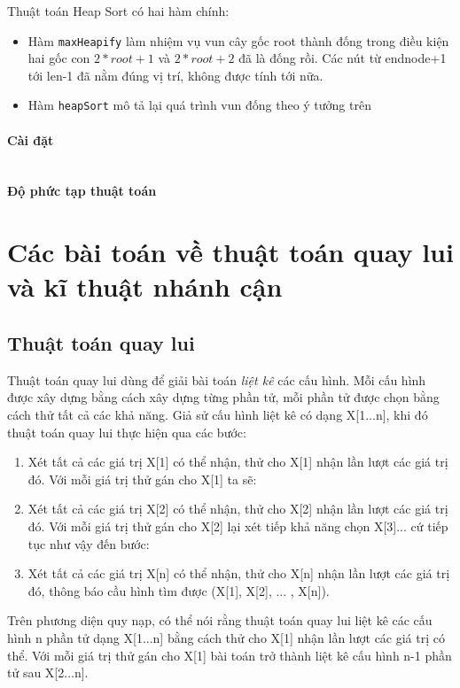 \documentclass[8pt, a4paper]{article}
\newcommand{\mnt}[1]{\inputminted[frame=single, linenos=true, tabsize=4]{c++}{#1}}
\begin{document}
Thuật toán Heap Sort có hai hàm chính:

\begin{itemize}
\item Hàm \texttt{maxHeapify} làm nhiệm vụ vun cây gốc root thành đống trong điều kiện hai gốc con $2*root+1$ và $2*root+2$ đã là đống rồi. Các nút từ endnode+1 tới len-1 đã nằm đúng vị trí, không được tính tới nữa.
\item Hàm \texttt{heapSort} mô tả lại quá trình vun đống theo ý tưởng trên
\end{itemize}

\paragraph{Cài đặt}
\mnt{src/heapsort.cpp}

\paragraph{Độ phức tạp thuật toán}


\section{Các bài toán về thuật toán quay lui và kĩ thuật nhánh cận}
\subsection{Thuật toán quay lui}
Thuật toán quay lui dùng để giải bài toán \emph{liệt kê} các cấu hình. Mỗi cấu hình được xây dựng bằng cách xây dựng từng phần tử, mỗi phần tử được chọn bằng cách thử tất cả các khả năng. Giả sử cấu hình liệt kê có dạng X[1...n], khi đó thuật toán quay lui thực hiện qua các bước:
\begin{enumerate}
\item Xét tất cả các giá trị X[1] có thể nhận, thử cho X[1] nhận lần lượt các giá trị đó. Với mỗi giá trị thử gán cho X[1] ta sẽ:
\item Xét tất cả các giá trị X[2] có thể nhận, thử cho X[2] nhận lần lượt các giá trị đó. Với mỗi giá trị thử gán cho X[2] lại xét tiếp khả năng chọn X[3]... cứ tiếp tục như vậy đến bước:
\item Xét tất cả các giá trị X[n] có thể nhận, thử cho X[n] nhận lần lượt các giá trị đó, thông báo cầu hình tìm được (X[1], X[2], ... , X[n]).
\end{enumerate}

Trên phương diện quy nạp, có thể nói rằng thuật toán quay lui liệt kê các cấu hình n phần tử dạng X[1...n] bằng cách thử cho X[1] nhận lần lượt các giá trị có thể. Với mỗi giá trị thử gán cho X[1] bài toán trở thành liệt kê cấu hình n-1 phần tử sau X[2...n].\\
\end{document}
